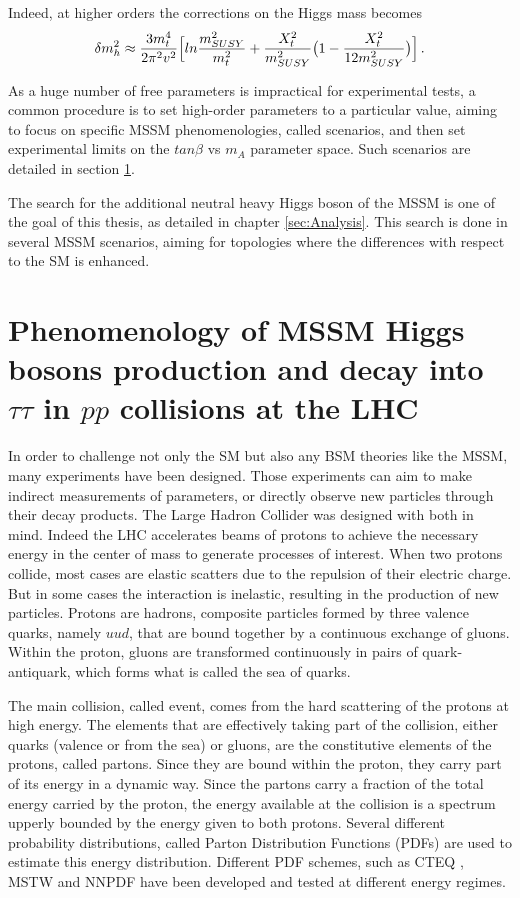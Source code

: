 Indeed, at higher orders the corrections on the Higgs mass becomes \cite{Nagashima:2014tva}
\begin{equation}
    \delta m_h^2 \approx \frac{3 m_t^4}{2\pi^2 v^2} \Big[ ln\frac{m_{SUSY}^2}{m_t^2} + \frac{X_t^2}{m_{SUSY}^2} \big( 1 - \frac{X_t^2}{12 m_{SUSY}^2} \big) \Big] \mend
\end{equation}

As a huge number of free parameters is impractical for experimental tests, a common procedure is to set high-order parameters to a particular value, aiming to focus on specific MSSM phenomenologies, called scenarios, and then set experimental limits on the $tan \beta$ vs $m_A$ parameter space. Such scenarios are detailed in section \ref{sec:pheno}.

The search for the additional neutral heavy Higgs boson of the MSSM is one of the goal of this thesis, as detailed in chapter \ref{sec:Analysis}. This search is done in several MSSM scenarios, aiming for topologies where the differences with respect to the SM is enhanced. 

\section{Phenomenology of MSSM Higgs bosons production and decay into $\tau\tau$ in $pp$ collisions at the LHC}
\label{sec:pheno}

In order to challenge not only the SM but also any BSM theories like the MSSM, many experiments have been designed. Those experiments can aim to make indirect measurements of parameters, or directly observe new particles through their decay products. The Large Hadron Collider was designed with both in mind. Indeed the LHC accelerates beams of protons to achieve the necessary energy in the center of mass to generate processes of interest. When two protons collide, most cases are elastic scatters due to the repulsion of their electric charge. But in some cases the interaction is inelastic, resulting in the production of new particles. Protons are hadrons, composite particles formed by three valence quarks, namely $uud$, that are bound together by a continuous exchange of gluons. Within the proton, gluons are transformed continuously in pairs of quark-antiquark, which forms what is called the sea of quarks.

The main collision, called event, comes from the hard scattering of the protons at high energy. The elements that are effectively taking part of the collision, either quarks (valence or from the sea) or gluons, are the constitutive elements of the protons, called partons. Since they are bound within the proton, they carry part of its energy in a dynamic way. Since the partons carry a fraction of the total energy carried by the proton, the energy available at the collision is a spectrum upperly bounded by the energy given to both protons. Several different probability distributions, called Parton Distribution Functions (PDFs) are used to estimate this energy distribution. Different PDF schemes, such as CTEQ \cite{Pumplin:2002vw}, MSTW \cite{Martin:2009iq} and NNPDF \cite{Ball:2008by} have been developed and tested at different energy regimes.

